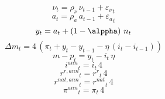 \begin{dmath}
{{\nu}}_{t}={{\rho_{\nu}}}\, {{\nu}}_{t-1}+{{\varepsilon_\nu}}_{t}
\end{dmath}
\begin{dmath}
{{a}}_{t}={{\rho_a}}\, {{a}}_{t-1}+{{\varepsilon_a}}_{t}
\end{dmath}
\begin{dmath}
{{y}}_{t}={{a}}_{t}+\left(1-{{\alppha}}\right)\, {{n}}_{t}
\end{dmath}
\begin{dmath}
{{\Delta m}}_{t}=4\, \left({{\pi}}_{t}+{{y}}_{t}-{{y}}_{t-1}-{{\eta}}\, \left({{i}}_{t}-{{i}}_{t-1}\right)\right)
\end{dmath}
\begin{dmath}
{{m-p}}_{t}={{y}}_{t}-{{i}}_{t}\, {{\eta}}
\end{dmath}
\begin{dmath}
{{i^{ann}}}_{t}={{i}}_{t}\, 4
\end{dmath}
\begin{dmath}
{{r^{r,ann}}}_{t}={{r^r}}_{t}\, 4
\end{dmath}
\begin{dmath}
{{r^{nat,ann}}}_{t}={{r^{nat}}}_{t}\, 4
\end{dmath}
\begin{dmath}
{{\pi^{ann}}}_{t}={{\pi}}_{t}\, 4
\end{dmath}
